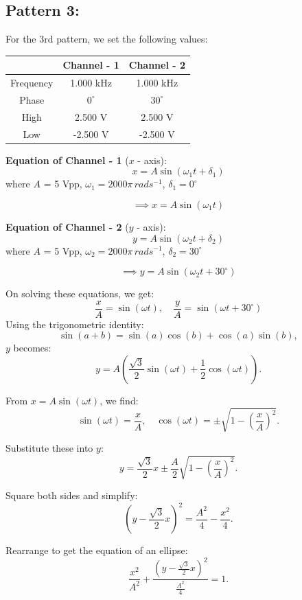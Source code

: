 \documentclass[12pt]{article}
\begin{document}
\subsection{Pattern 3:}
For the 3rd pattern, we set the following values:
\begin{table}[H]
    \centering
    \begin{tabular}{|c|c|c|}
    \hline
        & \textbf{Channel - 1} & \textbf{Channel - 2}\\
    \hline
    Frequency & 1.000 kHz & 1.000 kHz\\
    \hline
    Phase     & $0^{\circ}$ & $30^{\circ}$\\
    \hline
    High      & 2.500 V & 2.500 V\\
    \hline
    Low       & -2.500 V & -2.500 V\\
    \hline
    \end{tabular}
\end{table}

\textbf{Equation of Channel - 1} ($x$ - axis):
\[
x = A \sin{\left(\omega_1 t + \delta_1\right)}
\]
where $A$ = 5 Vpp, $\omega_1 = 2000 \pi \, rad s^{-1}$, $\delta_1 = 0^{\circ}$

\[
\implies x = A \sin{\left(\omega_1 t\right)}
\]

\textbf{Equation of Channel - 2} ($y$ - axis):
\[
y = A \sin{\left(\omega_2 t + \delta_2\right)}
\]
where $A$ = 5 Vpp, $\omega_2 = 2000 \pi \, rad s^{-1}$, $\delta_2 = 30^{\circ}$

\[
\implies y = A \sin{\left(\omega_2 t + 30^\circ\right)}
\]

On solving these equations, we get:
\[
\frac{x}{A} = \sin{\left(\omega t\right)}, \quad \frac{y}{A} = \sin{\left(\omega t + 30^\circ\right)}
\]
Using the trigonometric identity:
\[
\sin(a + b) = \sin(a)\cos(b) + \cos(a)\sin(b),
\]
\(y\) becomes:
\[
y = A \left( \frac{\sqrt{3}}{2} \sin(\omega t) + \frac{1}{2} \cos(\omega t) \right).
\]

From \(x = A \sin(\omega t)\), we find:
\[
\sin(\omega t) = \frac{x}{A}, \quad \cos(\omega t) = \pm \sqrt{1 - \left(\frac{x}{A}\right)^2}.
\]

Substitute these into \(y\):
\[
y = \frac{\sqrt{3}}{2}x \pm \frac{A}{2} \sqrt{1 - \left(\frac{x}{A}\right)^2}.
\]

Square both sides and simplify:
\[
\left(y - \frac{\sqrt{3}}{2}x\right)^2 = \frac{A^2}{4} - \frac{x^2}{4}.
\]

Rearrange to get the equation of an ellipse:
\[
\frac{x^2}{A^2} + \frac{\left(y - \frac{\sqrt{3}}{2}x\right)^2}{\frac{A^2}{4}} = 1.
\]
\end{document}
